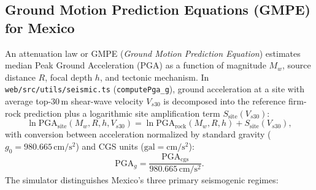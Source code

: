\documentclass[11pt,a4paper]{article}
\newcommand{\src}[1]{\nolinkurl{#1}}
\newcommand{\unit}[1]{\mathrm{#1}}
\begin{document}
\subsection{Ground Motion Prediction Equations (GMPE) for Mexico}
\label{sec:sismo-modelos-gmpe}

An attenuation law or GMPE (\emph{Ground Motion Prediction Equation}) estimates median Peak Ground Acceleration
($\mathrm{PGA}$) as a function of magnitude $M_w$, source distance $R$, focal depth $h$, and tectonic mechanism.
In \src{web/src/utils/seismic.ts} (\texttt{computePga\_g}), ground acceleration at a site with average top-$30\,\unit{m}$
shear-wave velocity $V_{s30}$ is decomposed into the reference firm-rock prediction plus a logarithmic site
amplification term $S_{\mathrm{site}}(V_{s30})$:
\begin{equation}
  \ln\mathrm{PGA}_{\mathrm{site}}(M_w,R,h,V_{s30})
  = \ln\mathrm{PGA}_{\mathrm{rock}}(M_w,R,h) + S_{\mathrm{site}}(V_{s30}),
  \label{eq:gmpe-general}
\end{equation}
with conversion between acceleration normalized by standard gravity ($g_0 = 980.665\,\unit{cm/s^2}$) and
CGS units ($\unit{gal} = \unit{cm/s^2}$):
\begin{equation}
  \mathrm{PGA}_{g} = \frac{\mathrm{PGA}_{\mathrm{cgs}}}{980.665\,\unit{cm/s^2}}.
\end{equation}
The simulator distinguishes Mexico's three primary seismogenic regimes:
\end{document}
